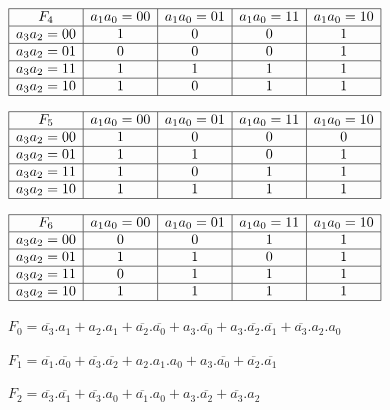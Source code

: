 \begin{center}
$\begin{array}{|c|c|c|c|c|}
\hline
F_4 & a_1a_0=00 & a_1a_0=01 & a_1a_0=11 & a_1a_0=10 \\
\hline
a_3a_2=00  &  1  &  0  &  0  &  1  \\
\hline
a_3a_2=01  &   0 &  0  &  0  &  1  \\
\hline
a_3a_2=11  &  1  &  1  &  1  &  1  \\
\hline
a_3a_2=10  & 1   &  0  &  1  & 1   \\
\hline
\end{array}$
\end{center}

\begin{center}
$\begin{array}{|c|c|c|c|c|}
\hline
F_5 & a_1a_0=00 & a_1a_0=01 & a_1a_0=11 & a_1a_0=10 \\
\hline
a_3a_2=00  & 1   &  0  &  0  &  0  \\
\hline
a_3a_2=01  &  1  &  1  &  0  &  1  \\
\hline
a_3a_2=11  &  1  &  0  &  1  &  1  \\
\hline
a_3a_2=10  &  1  &  1  & 1   &  1  \\
\hline
\end{array}$
\end{center}

\begin{center}
$\begin{array}{|c|c|c|c|c|}
\hline
F_6 & a_1a_0=00 & a_1a_0=01 & a_1a_0=11 & a_1a_0=10 \\
\hline
a_3a_2=00  & 0   &  0  &  1  &  1  \\
\hline
a_3a_2=01  &  1  &  1  &  0  & 1   \\
\hline
a_3a_2=11  &  0  &  1  &  1  & 1   \\
\hline
a_3a_2=10  &  1  &  1  &  1  & 1   \\
\hline
\end{array}$
\end{center}


$F_0=\overline{a_3}.a_1+a_2.a_1+\overline{a_2}.\overline{a_0}+a_3.\overline{a_0}+a_3.\overline{a_2}.\overline{a_1}+\overline{a_3}.a_2.a_0$

$F_1=\overline{a_1}.\overline{a_0}+\overline{a_3}.\overline{a_2}+a_2.a_1.a_0+a_3.\overline{a_0}+\overline{a_2}.\overline{a_1}$

$F_2=\overline{a_3}.\overline{a_1}+\overline{a_3}.a_0+\overline{a_1}.a_0+a_3.\overline{a_2}+\overline{a_3}.a_2$

